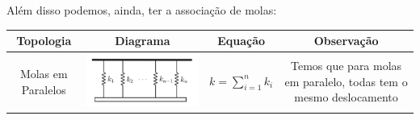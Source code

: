 \documentclass{article}
\begin{document}
                Além disso podemos, ainda, ter a associação de molas:
                \begin{table}[h]
                    \centering
                    \begin{tabular}{|c|c|c|c|}
                        \hline
                        Topologia & Diagrama & Equação & Observação \\ \hline
                        Molas em Paralelos
                        &
                        \begin{minipage}{.3\textwidth}
                            \centering
                            \includegraphics[width=.8\textwidth]{imgs/mola_eq_5.png}
                        \end{minipage}
                        &
                        $k = \sum_{i = 1}^n k_i$
                        &
                        \begin{minipage}{.3\columnwidth}
                            Temos que para molas em paralelo, todas tem o mesmo deslocamento%
                        \end{minipage} \\ \hline


\end{tabular}
\end{table}
\end{document}
